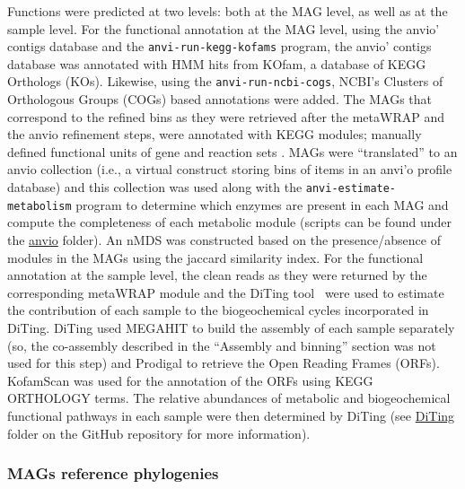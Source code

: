    Functions were predicted at two levels: both at the MAG level, as well as at the sample level. 
   For the functional annotation at the MAG level, using the anvio’ contigs database and the \texttt{anvi-run-kegg-kofams} program, 
   the anvio’ contigs database was annotated with HMM hits from KOfam, a database of KEGG Orthologs (KOs). 
   Likewise, using the \texttt{anvi-run-ncbi-cogs}, NCBI’s Clusters of Orthologous Groups (COGs) based annotations were added. 
   The MAGs that correspond to the refined bins as they were retrieved after the metaWRAP and the anvio refinement steps, were annotated with KEGG modules; 
   manually defined functional units of gene and reaction sets \citep{kanehisa_kegg_2012}. 
   MAGs were “translated” to an anvio collection (i.e., a virtual construct storing bins of items in an anvi’o profile database) and this collection was used 
   along with the \texttt{anvi-estimate-metabolism} program to determine which enzymes are present in each MAG and compute the completeness of each metabolic
   module (scripts can be found under the \href{https://github.com/hariszaf/karpathos-swamp/tree/main/anvio}{anvio} folder). 
   An nMDS was constructed based on the presence/absence of modules in the MAGs using the jaccard similarity index. 
   For the functional annotation at the sample level, the clean reads as they were returned by the corresponding metaWRAP module and the DiTing tool~\citep{xue_diting_2021} 
   were used to estimate the contribution of each sample to the biogeochemical cycles incorporated in DiTing. 
   DiTing used MEGAHIT \citep{li_megahit_2015} to build the assembly of each sample separately (so, the co-assembly described in the “Assembly and binning” section was not used for this step) 
   and Prodigal to retrieve the Open Reading Frames (ORFs). 
   KofamScan \citep{aramaki_kofamkoala_2020} was used for the annotation of the ORFs using KEGG ORTHOLOGY terms. 
   The relative abundances of metabolic and biogeochemical functional pathways in each sample were then determined by DiTing 
   (see \href{https://github.com/hariszaf/karpathos-swamp/tree/main/DiTing}{DiTing} folder on the GitHub repository for more information). 


\subsubsection*{MAGs reference phylogenies}

